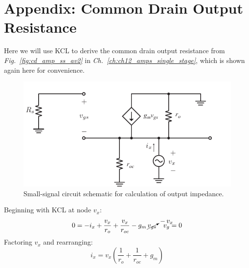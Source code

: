 \chapter{Appendix: Common Drain Output Resistance}
\label{app:cd_output_kcl}
Here we will use KCL to derive the common drain output resistance from \emph{Fig.~\ref{fig:cd_amp_ss_av2}} in \emph{Ch.~\ref{ch:ch12_amps_single_stage}}, which is shown again here for convenience.
\begin{figure}[H]
\centering
\includegraphics[scale=1.25]{./figures/figs_ch12_amps_single_stage/cd_amp_ss_rout}
\caption{Small-signal circuit schematic for calculation of output impedance.}
\end{figure}
\noindent
Beginning with KCL at node $v_x$:
    \begin{align*}
        0 &= -i_x + \frac{v_x}{r_o} + \frac{v_x}{r_{oc}} - g_m\,\cancelto{-\,v_x}{v_{gs}} &\textit{$v_g = 0$}
    \end{align*}
Factoring $v_x$ and rearranging:
    \begin{equation*}
        i_x = v_x \left(\frac{1}{r_o} + \frac{1}{r_{oc}} + g_m \right)
    \end{equation*}
